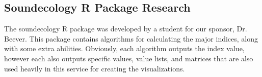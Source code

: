 \subsection{Soundecology R Package Research}
The soundecology R package was developed by a student for our sponsor, Dr. Beever. This package contains algorithms for calculating the major indices, along with some extra abilities. Obviously, each algorithm outputs the index value, however each also outputs specific values, value lists, and matrices that are also used heavily in this service for creating the visualizations.







